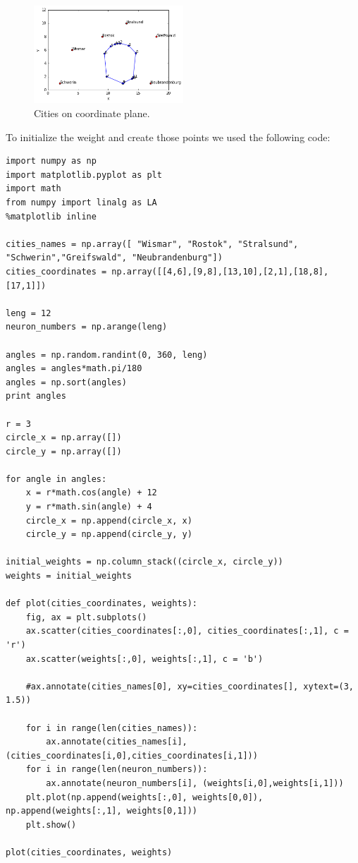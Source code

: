 \documentclass[a4paper, 12pt]{article}
\begin{document}
\begin{figure}[h]
  \centering
  \caption{Cities on coordinate plane.\label{citiesCoord}}
  \includegraphics[width=0.5\textwidth]{cities_plotted}
\end{figure}

To initialize the weight and create those points we used the following code:

\lstset{language=Python}
\begin{lstlisting}[frame=single]
import numpy as np
import matplotlib.pyplot as plt
import math
from numpy import linalg as LA
%matplotlib inline

cities_names = np.array([ "Wismar", "Rostok", "Stralsund", "Schwerin","Greifswald", "Neubrandenburg"])
cities_coordinates = np.array([[4,6],[9,8],[13,10],[2,1],[18,8],[17,1]])

leng = 12
neuron_numbers = np.arange(leng)

angles = np.random.randint(0, 360, leng)
angles = angles*math.pi/180
angles = np.sort(angles)
print angles

r = 3
circle_x = np.array([])
circle_y = np.array([])

for angle in angles:
    x = r*math.cos(angle) + 12
    y = r*math.sin(angle) + 4
    circle_x = np.append(circle_x, x)
    circle_y = np.append(circle_y, y)

initial_weights = np.column_stack((circle_x, circle_y))
weights = initial_weights

def plot(cities_coordinates, weights):
    fig, ax = plt.subplots()
    ax.scatter(cities_coordinates[:,0], cities_coordinates[:,1], c = 'r')
    ax.scatter(weights[:,0], weights[:,1], c = 'b')

    #ax.annotate(cities_names[0], xy=cities_coordinates[], xytext=(3, 1.5))

    for i in range(len(cities_names)):
        ax.annotate(cities_names[i], (cities_coordinates[i,0],cities_coordinates[i,1]))
    for i in range(len(neuron_numbers)):
        ax.annotate(neuron_numbers[i], (weights[i,0],weights[i,1]))
    plt.plot(np.append(weights[:,0], weights[0,0]), np.append(weights[:,1], weights[0,1]))
    plt.show()

plot(cities_coordinates, weights)
\end{lstlisting}
\end{document}
